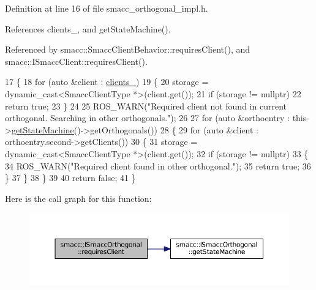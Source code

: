 Definition at line 16 of file smacc\+\_\+orthogonal\+\_\+impl.\+h.



References clients\+\_\+, and get\+State\+Machine().



Referenced by smacc\+::\+Smacc\+Client\+Behavior\+::requires\+Client(), and smacc\+::\+I\+Smacc\+Client\+::requires\+Client().


\begin{DoxyCode}
17 \{
18     \textcolor{keywordflow}{for} (\textcolor{keyword}{auto} &client : \hyperlink{classsmacc_1_1ISmaccOrthogonal_a0f270e9c8c126198f6bce542ab4e04ba}{clients\_})
19     \{
20         storage = \textcolor{keyword}{dynamic\_cast<}SmaccClientType *\textcolor{keyword}{>}(client.get());
21         \textcolor{keywordflow}{if} (storage != \textcolor{keyword}{nullptr})
22             \textcolor{keywordflow}{return} \textcolor{keyword}{true};
23     \}
24 
25     ROS\_WARN(\textcolor{stringliteral}{"Required client not found in current orthogonal. Searching in other orthogonals."});
26 
27     \textcolor{keywordflow}{for} (\textcolor{keyword}{auto} &orthoentry : this->\hyperlink{classsmacc_1_1ISmaccOrthogonal_aae265ec480b8ed552ddc79afd2d93a62}{getStateMachine}()->getOrthogonals())
28     \{
29         \textcolor{keywordflow}{for} (\textcolor{keyword}{auto} &client : orthoentry.second->getClients())
30         \{
31             storage = \textcolor{keyword}{dynamic\_cast<}SmaccClientType *\textcolor{keyword}{>}(client.get());
32             \textcolor{keywordflow}{if} (storage != \textcolor{keyword}{nullptr})
33             \{
34                 ROS\_WARN(\textcolor{stringliteral}{"Required client found in other orthogonal."});
35                 \textcolor{keywordflow}{return} \textcolor{keyword}{true};
36             \}
37         \}
38     \}
39 
40     \textcolor{keywordflow}{return} \textcolor{keyword}{false};
41 \}
\end{DoxyCode}


Here is the call graph for this function\+:
\nopagebreak
\begin{figure}[H]
\begin{center}
\leavevmode
\includegraphics[width=350pt]{classsmacc_1_1ISmaccOrthogonal_a602e16b09f8a1b3de889f2f3d90a3211_cgraph}
\end{center}
\end{figure}




